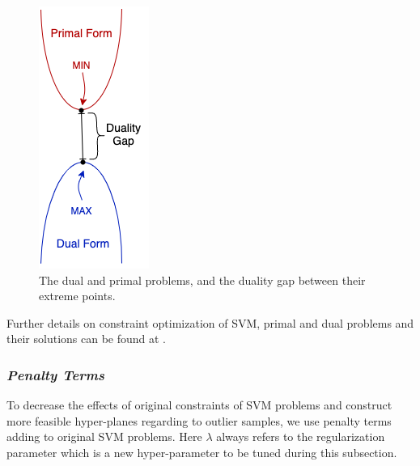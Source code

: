 \begin{figure}[h]
	\centering
	\includegraphics[width=.15\linewidth]{fig/dualityGap.png}
	\vspace*{2mm}
	\caption{The dual and primal problems, and the duality gap between their extreme points.}
	\label{fig:duality_gap}
\end{figure}

Further details on constraint optimization of SVM, primal and dual problems and their solutions can be found at  \cite[pg.~13-19]{svm_book}.

\subsubsection*{\textit{Penalty Terms}}
To decrease the effects of original constraints of SVM problems and construct more feasible hyper-planes regarding to outlier samples, we use penalty terms adding to original SVM problems. Here $\lambda$ always refers to the regularization parameter which is a new hyper-parameter to be tuned during this subsection.

